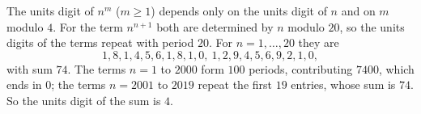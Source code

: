 The units digit of $n^{m}$ ($m\ge1$) depends only on the units digit of $n$ and on $m$ modulo $4$. For the term $n^{n+1}$ both are determined by $n$ modulo $20$, so the units digits of the terms repeat with period $20$. For $n=1,\dots,20$ they are
\[
1,8,1,4,5,6,1,8,1,0,\ 1,2,9,4,5,6,9,2,1,0,
\]
with sum $74$. The terms $n=1$ to $2000$ form $100$ periods, contributing $7400$, which ends in $0$; the terms $n=2001$ to $2019$ repeat the first $19$ entries, whose sum is $74$. So the units digit of the sum is $\boxed{4}$.
